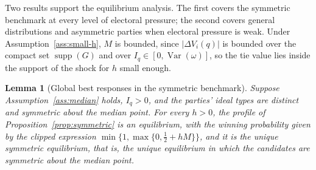 \documentclass[12pt,letterpaper]{article}
\newtheorem{lemma}{Lemma}
\begin{document}
Two results support the equilibrium analysis. The first covers the symmetric benchmark at every level of electoral pressure; the second covers general distributions and asymmetric parties when electoral pressure is weak. Under Assumption~\ref{ass:small-h}, $M$ is bounded, since $|\Delta V_i(q)|$ is bounded over the compact set $\operatorname{supp}(G)$ and over $I_q\in[0,\operatorname{Var}(\omega)]$, so the tie value lies inside the support of the shock for $h$ small enough.

\begin{lemma}[Global best responses in the symmetric benchmark]\label{lem:global}
Suppose Assumption~\ref{ass:median} holds, $I_q>0$, and the parties' ideal types are distinct and symmetric about the median point. For every $h>0$, the profile of Proposition~\ref{prop:symmetric} is an equilibrium, with the winning probability given by the clipped expression $\min\{1,\max\{0,\tfrac12+hM\}\}$, and it is the unique symmetric equilibrium, that is, the unique equilibrium in which the candidates are symmetric about the median point.
\end{lemma}
\end{document}
